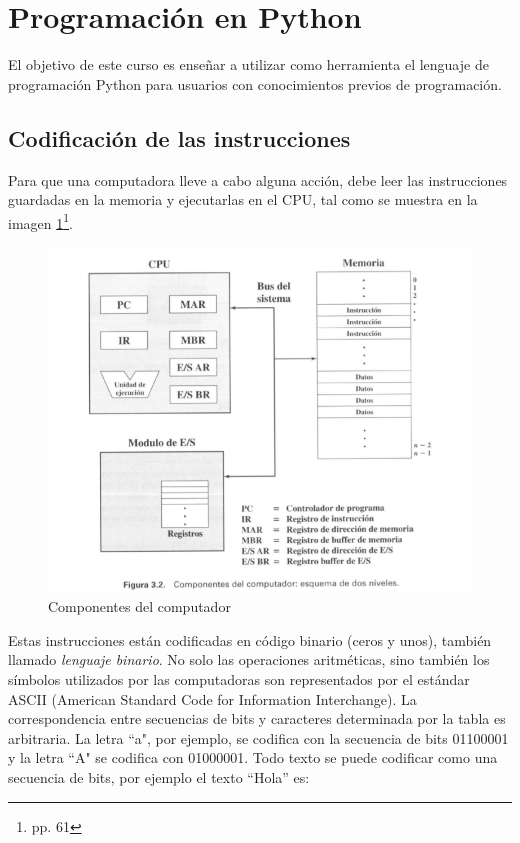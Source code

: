 \section{Programación en Python}

El objetivo de este curso es enseñar a utilizar como herramienta el lenguaje de programación Python para usuarios con conocimientos previos de programación.

\subsection{Codificación de las instrucciones}

Para que una computadora lleve a cabo alguna acción, debe leer las instrucciones guardadas en la memoria y ejecutarlas en el CPU, tal como se muestra en la imagen \ref{graf:componentes-computador}\footnote{\cite{Stallings2005} pp. 61}.

\begin{figure}[ht!]
   \centering
   \includegraphics[scale=0.4]{imagenes/estructura_computadora.png}
   \caption{Componentes del computador}\label{graf:componentes-computador}
\end{figure}

Estas instrucciones están codificadas en código binario (ceros y unos), también llamado \textit{lenguaje binario}. No solo las operaciones aritméticas, sino también los símbolos utilizados por las computadoras son representados por el estándar ASCII (American Standard Code for Information Interchange).  La correspondencia entre secuencias de bits y caracteres determinada
por la tabla es arbitraria. La letra ``a", por ejemplo, se codifica con la secuencia de bits 01100001 y la letra ``A" se codifica con 01000001. Todo texto se puede codificar como una secuencia de bits, por ejemplo el texto ``Hola'' es:\\

